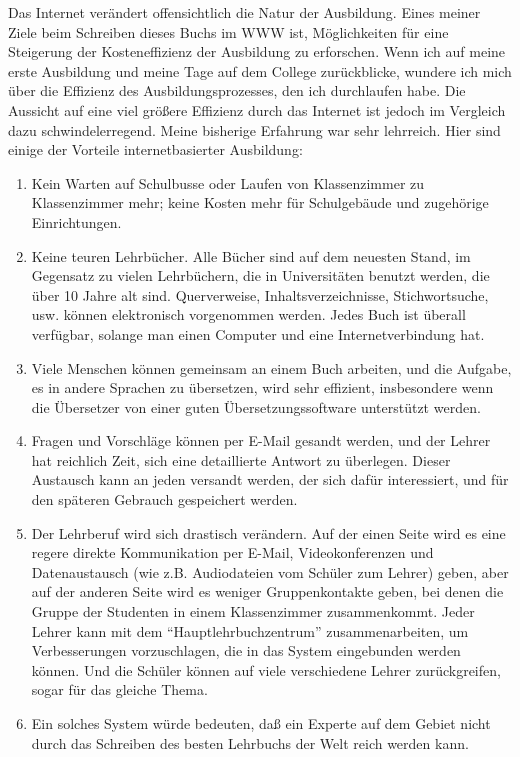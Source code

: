 Das Internet verändert offensichtlich die Natur der Ausbildung.
Eines meiner Ziele beim Schreiben dieses Buchs im WWW ist, Möglichkeiten für eine Steigerung der Kosteneffizienz der Ausbildung zu erforschen.
Wenn ich auf meine erste Ausbildung und meine Tage auf dem College zurückblicke, wundere ich mich über die Effizienz des Ausbildungsprozesses, den ich durchlaufen habe.
Die Aussicht auf eine viel größere Effizienz durch das Internet ist jedoch im Vergleich dazu schwindelerregend.
Meine bisherige Erfahrung war sehr lehrreich.
Hier sind einige der Vorteile internetbasierter Ausbildung:

\begin{enumerate}[label={\roman*.}] 
\item Kein Warten auf Schulbusse oder Laufen von Klassenzimmer zu Klassenzimmer mehr; keine Kosten mehr für Schulgebäude und zugehörige Einrichtungen.
\item Keine teuren Lehrbücher.
Alle Bücher sind auf dem neuesten Stand, im Gegensatz zu vielen Lehrbüchern, die in Universitäten benutzt werden, die über 10 Jahre alt sind.
Querverweise, Inhaltsverzeichnisse, Stichwortsuche, usw. können elektronisch vorgenommen werden.
Jedes Buch ist überall verfügbar, solange man einen Computer und eine Internetverbindung hat.
\item Viele Menschen können gemeinsam an einem Buch arbeiten, und die Aufgabe, es in andere Sprachen zu übersetzen, wird sehr effizient, insbesondere wenn die Übersetzer von einer guten Übersetzungssoftware unterstützt werden.
\item Fragen und Vorschläge können per E-Mail gesandt werden, und der Lehrer hat reichlich Zeit, sich eine detaillierte Antwort zu überlegen.
Dieser Austausch kann an jeden versandt werden, der sich dafür interessiert, und für den späteren Gebrauch gespeichert werden.
\item Der Lehrberuf wird sich drastisch verändern.
Auf der einen Seite wird es eine regere direkte Kommunikation per E-Mail, Videokonferenzen und Datenaustausch (wie z.B. Audiodateien vom Schüler zum Lehrer) geben,
aber auf der anderen Seite wird es weniger Gruppenkontakte geben, bei denen die Gruppe der Studenten in einem Klassenzimmer zusammenkommt.
Jeder Lehrer kann mit dem \enquote{Hauptlehrbuchzentrum} zusammenarbeiten, um Verbesserungen vorzuschlagen, die in das System eingebunden werden können.
Und die Schüler können auf viele verschiedene Lehrer zurückgreifen, sogar für das gleiche Thema.
\item Ein solches System würde bedeuten, daß ein Experte auf dem Gebiet nicht durch das Schreiben des besten Lehrbuchs der Welt reich werden kann.

\end{enumerate}
